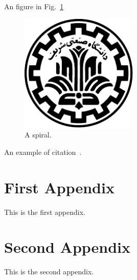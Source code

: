 \documentclass[wcp]{jmlr}
\begin{document}
An figure in Fig.~\ref{fig:spiral}
\begin{figure}[htp]
\begin{center}
\includegraphics[width=0.5\textwidth]{../images/logo.pdf}
\caption{A spiral.}\label{fig:spiral}
\end{center}
\end{figure}

An example of citation~\cite{DBLP:conf/acml/2009}.


%


\appendix

\section{First Appendix}\label{apd:first}

This is the first appendix.

\section{Second Appendix}\label{apd:second}

This is the second appendix.
\end{document}
